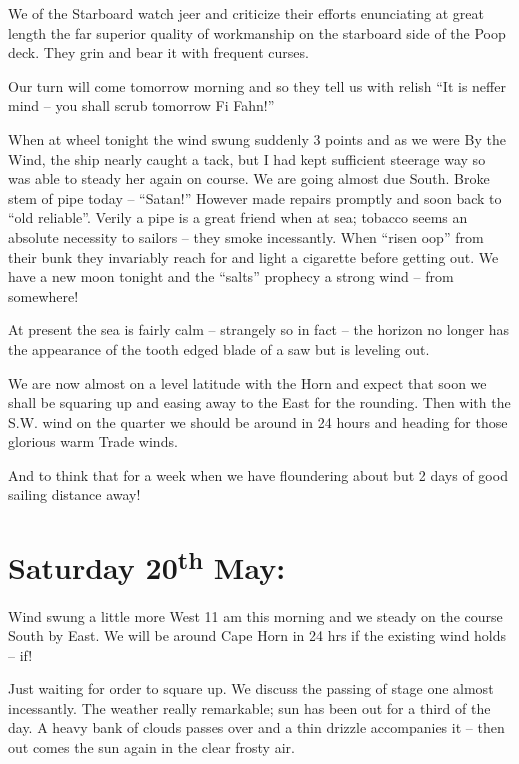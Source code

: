 \documentclass[
  11pt,
  msmallroyalvopaper
]{memoir}
\begin{document}
We of the Starboard watch jeer and criticize their efforts enunciating
at great length the far superior quality of workmanship on the starboard
side of the Poop deck. They grin and bear it with frequent curses.

Our turn will come tomorrow morning and so they tell us with relish ``It
is neffer mind -- you shall scrub tomorrow Fi Fahn!''

When at wheel tonight the wind swung suddenly 3 points and as we were By
the Wind, the ship nearly caught a tack, but I had kept sufficient
steerage way so was able to steady her again on course. We are going
almost due South. Broke stem of pipe today -- ``Satan!'' However made
repairs promptly and soon back to ``old reliable''. Verily a pipe is a
great friend when at sea; tobacco seems an absolute necessity to sailors
-- they smoke incessantly. When ``risen oop'' from their bunk they
invariably reach for and light a cigarette before getting out. We have a
new moon tonight and the ``salts'' prophecy a strong wind -- from
somewhere!

At present the sea is fairly calm -- strangely so in fact -- the horizon
no longer has the appearance of the tooth edged blade of a saw but is
leveling out.

We are now almost on a level latitude with the Horn and expect that soon
we shall be squaring up and easing away to the East for the rounding.
Then with the S.W. wind on the quarter we should be around in 24 hours
and heading for those glorious warm Trade winds.

And to think that for a week when we have floundering about but 2 days
of good sailing distance away!

\hypertarget{saturday-20th-may}{%
\section{\texorpdfstring{Saturday 20\textsuperscript{th}
May:}{Saturday 20th May:}}\label{saturday-20th-may}}

Wind swung a little more West 11 am this morning and we steady on the
course South by East. We will be around Cape Horn in 24 hrs if the
existing wind holds -- if!

Just waiting for order to square up. We discuss the passing of stage one
almost incessantly. The weather really remarkable; sun has been out for
a third of the day. A heavy bank of clouds passes over and a thin
drizzle accompanies it -- then out comes the sun again in the clear
frosty air.
\end{document}
